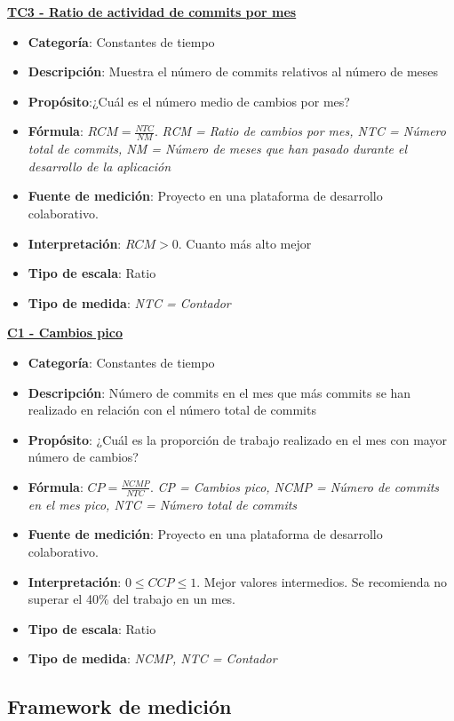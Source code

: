 \textbf{\underline{TC3 - Ratio de actividad de commits por mes}}

\begin{itemize}
	\item \textbf{Categoría}: Constantes de tiempo
	\item \textbf{Descripción}: Muestra el número de commits relativos al número de meses
	\item \textbf{Propósito}:¿Cuál es el número medio de cambios por mes?
	\item \textbf{Fórmula}: $RCM = \frac{NTC}{NM}$. \textit{RCM = Ratio de cambios por mes, NTC = Número total de commits, NM = Número de meses que han pasado durante el desarrollo de la aplicación}
	\item \textbf{Fuente de medición}: Proyecto en una plataforma de desarrollo colaborativo.
	\item \textbf{Interpretación}: $RCM > 0$. Cuanto más alto mejor
	\item \textbf{Tipo de escala}: Ratio
	\item \textbf{Tipo de medida}: \textit{NTC = Contador}
\end{itemize}

\textbf{\underline{C1 - Cambios pico}}

\begin{itemize}
	\item \textbf{Categoría}: Constantes de tiempo
	\item \textbf{Descripción}: Número de commits en el mes que más commits se han realizado en relación con el número total de commits
	\item \textbf{Propósito}: ¿Cuál es la proporción de trabajo realizado en el mes con mayor número de cambios?
	\item \textbf{Fórmula}: $CP = \frac{NCMP}{NTC}$. \textit{CP = Cambios pico, NCMP = Número de commits en el mes pico, NTC = Número total de commits}
	\item \textbf{Fuente de medición}: Proyecto en una plataforma de desarrollo colaborativo.
	\item \textbf{Interpretación}: $0 \leq CCP \leq 1$. Mejor valores intermedios. Se recomienda no superar el 40\% del trabajo en un mes.
	\item \textbf{Tipo de escala}: Ratio
	\item \textbf{Tipo de medida}: \textit{NCMP, NTC = Contador}
\end{itemize}

\subsection{Framework de medición}\label{sect:3_3_3_FrameworkMedicion}

